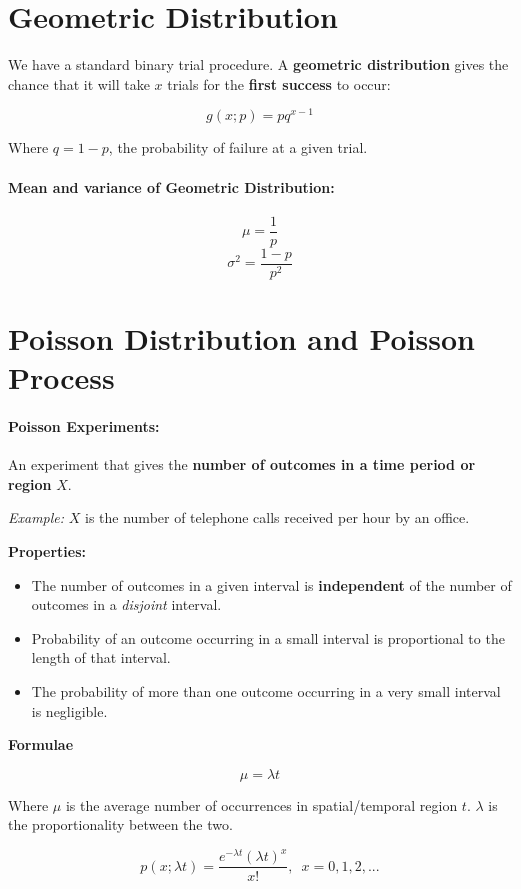 \documentclass[a4paper,12pt]{report}
\begin{document}
\section{Geometric Distribution}

We have a standard binary trial procedure. A \textbf{geometric distribution} gives the chance that it will take $x$ trials for the \textbf{first success} to occur:

$$g(x;p) = pq^{x-1}$$

Where $q = 1-p$, the probability of failure at a given trial.

\paragraph{Mean and variance of Geometric Distribution: } 
$$\mu = \frac{1}{p}$$
$$\sigma^2 = \frac{1-p}{p^2}$$

\section{Poisson Distribution and Poisson Process}

\paragraph{Poisson Experiments: } An experiment that gives the \textbf{number of outcomes in a time period or region} $X$.

\textit{Example: } $X$ is the number of telephone calls received per hour by an office.

\textbf{Properties: } 

\begin{itemize}
\item The number of outcomes in a given interval is \textbf{independent} of the number of outcomes in a \textit{disjoint} interval.
\item Probability of an outcome occurring in a small interval is proportional to the length of that interval.
\item The probability of more than one outcome occurring in a very small interval is negligible.
\end{itemize}

\textbf{Formulae} 

$$\mu = \lambda t$$

Where $\mu$ is the average number of occurrences in spatial/temporal region $t$. $\lambda$ is the proportionality between the two.

$$p(x;\lambda t) = \frac{e^{-\lambda t} (\lambda t)^x}{x!},\,\,\, x=0,1,2,...$$
\end{document}
